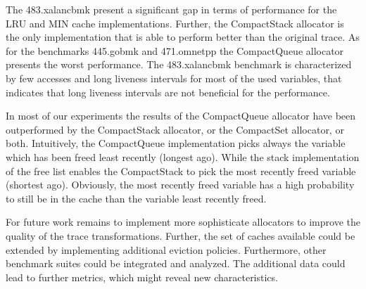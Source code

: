 \documentclass[onecolumn, openright, master, english, signatures]{dbrgrptt}
\begin{document}
The 483.xalancbmk present a significant gap in terms of performance for the \ac{LRU} and \ac{MIN} cache implementations. Further, the CompactStack allocator is the only implementation that is able to perform better than the original \ac{trace}. As for the benchmarks 445.gobmk and 471.omnetpp the CompactQueue allocator presents the worst performance. The 483.xalancbmk benchmark is characterized by few accesses and long liveness intervals for most of the used variables, that indicates that long liveness intervals are not beneficial for the performance.

In most of our experiments the results of the CompactQueue allocator have been outperformed by the CompactStack allocator, or the CompactSet allocator, or both. Intuitively, the CompactQueue implementation picks always the variable which has been freed least recently (longest ago). While the stack implementation of the free list enables the CompactStack to pick the most recently freed variable (shortest ago). Obviously, the most recently freed variable has a high probability to still be in the cache than the variable least recently freed.

For future work remains to implement more sophisticate allocators to improve the quality of the trace transformations. Further, the set of caches available could be extended by implementing additional eviction policies. Furthermore, other benchmark suites could be integrated and analyzed. The additional data could lead to further metrics, which might reveal new characteristics.


\backmatter%

%
\end{document}

